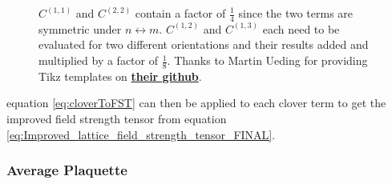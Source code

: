 \documentclass[a4paper,10pt]{article}
\begin{document}
\begin{figure}[H]
\begin{subfigure}[b]{0.4\textwidth}
{
}
\end{subfigure}
\caption{$C^{(1,1)}$ and $C^{(2,2)}$ contain a factor of $\frac{1}{4}$ since the two terms are symmetric under $n\leftrightarrow m$. $C^{(1,2)}$ and $C^{(1,3)}$ each need to be evaluated for two different orientations and their results added and multiplied by a factor of $\frac{1}{8}$. Thanks to Martin Ueding for providing Tikz templates on \href{https://github.com/HISKP-LQCD/lqcd-tikz-graphics}{\textbf{their github}}.}\label{figure:Clovers}
\end{figure}
equation \eqref{eq:cloverToFST} can then be applied to each clover term to get the improved field strength tensor from equation \eqref{eq:Improved_lattice_field_strength_tensor_FINAL}.
\subsubsection{Average Plaquette}
\end{document}
